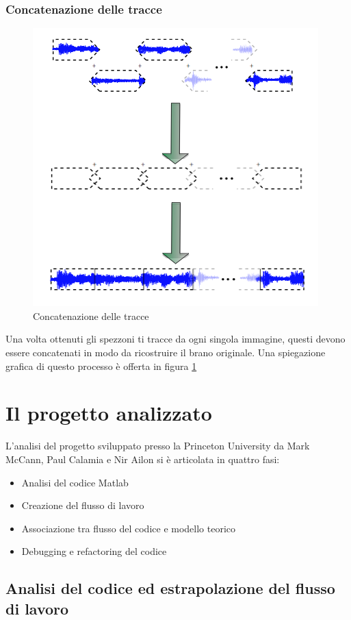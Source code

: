\subsubsection{Concatenazione delle tracce}
\begin{figure}[h!t]
\begin{center}
\includegraphics[scale=0.5]{./img/concatenation.png}
\caption{Concatenazione delle tracce}\label{fading}
\end{center}
\end{figure}
Una volta ottenuti gli spezzoni ti tracce da ogni singola immagine, questi devono essere concatenati in modo da ricostruire il brano originale. Una spiegazione grafica di questo processo \`e offerta in figura \ref{fading}
\section{Il progetto analizzato}
L'analisi del progetto sviluppato presso la Princeton University da Mark McCann, Paul Calamia e Nir Ailon si \`e articolata in quattro fasi:
\begin{itemize}
\item Analisi del codice Matlab
\item Creazione del flusso di lavoro
\item Associazione tra flusso del codice e modello teorico
\item Debugging e refactoring del codice
\end{itemize}
\subsection{Analisi del codice ed estrapolazione del flusso di lavoro}

